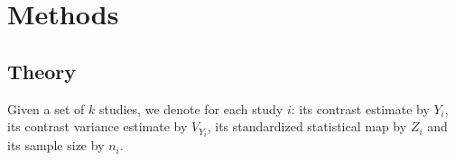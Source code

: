 \documentclass{llncs}
\newcommand{\effectvector}{Y}
\newcommand{\effect}[1][i]{\effectvector_{#1}}
\newcommand{\vareffect}[1][i]{V_{\effect[#1]}}
\newcommand{\zeffect}[1][i]{Z_{#1}}
\begin{document}



\section{Methods}
\subsection{Theory}
Given a set of $k$ studies, we denote for each study $i$: its contrast estimate by $\effect$, its contrast variance estimate by $\vareffect$, its standardized statistical map by $\zeffect$ and its sample size by $n_i$.
\end{document}
